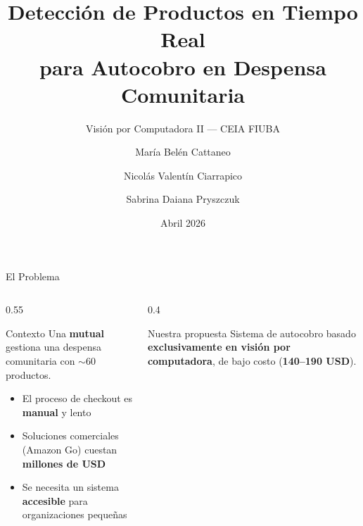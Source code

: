\documentclass[aspectratio=169,10pt]{beamer}
\title[Autocobro Despensa]{Detección de Productos en Tiempo Real\\para Autocobro en Despensa Comunitaria}
\subtitle{Visión por Computadora II --- CEIA FIUBA}
\author[Grupo 4]{María Belén Cattaneo \and Nicolás Valentín Ciarrapico \and Sabrina Daiana Pryszczuk}
\institute[CEIA FIUBA]{CEIA --- Facultad de Ingeniería --- Universidad de Buenos Aires}
\date{Abril 2026}
\begin{document}
\begin{frame}[plain]
  \maketitle
\end{frame}

\begin{frame}{El Problema}
  \begin{columns}[T]
    \begin{column}{0.55\textwidth}
      \begin{block}{Contexto}
        Una \textbf{mutual} gestiona una despensa comunitaria con $\sim$60 productos.
      \end{block}
      \vspace{0.3cm}
      \begin{itemize}
        \item El proceso de checkout es \textbf{manual} y lento
        \item Soluciones comerciales (Amazon Go) cuestan \textbf{millones de USD}
        \item Se necesita un sistema \textbf{accesible} para organizaciones pequeñas
      \end{itemize}
    \end{column}
    \begin{column}{0.4\textwidth}
      \begin{block}{Nuestra propuesta}
        Sistema de autocobro basado \textbf{exclusivamente en visión por computadora}, de bajo costo (\textbf{140--190 USD}).
      \end{block}
    \end{column}
  \end{columns}
\end{frame}
\end{document}
